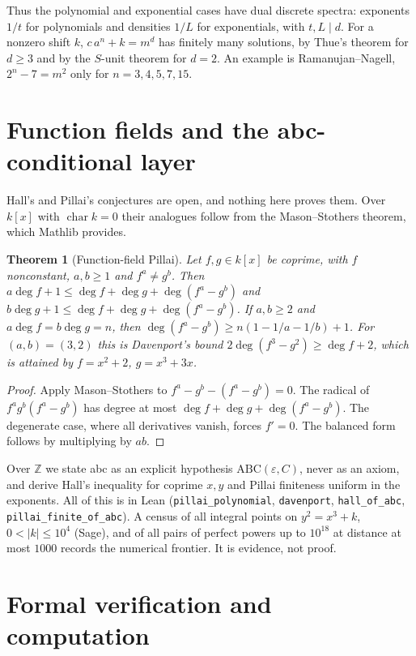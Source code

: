 \documentclass[11pt]{amsart}
\newtheorem{theorem}{Theorem}[section]
\theoremstyle{definition}
\theoremstyle{remark}
\newcommand{\Z}{\mathbb{Z}}
\newcommand{\lean}[1]{\texttt{#1}}
\begin{document}
Thus the polynomial and exponential cases have dual discrete spectra: exponents $1/t$ for polynomials and densities $1/L$ for exponentials, with $t,L\mid d$. For a nonzero shift $k$, $c\,a^n+k=m^d$ has finitely many solutions, by Thue's theorem for $d\ge3$ and by the $S$-unit theorem for $d=2$. An example is Ramanujan--Nagell, $2^n-7=m^2$ only for $n=3,4,5,7,15$.

\section{Function fields and the abc-conditional layer}\label{sec:ff}

Hall's and Pillai's conjectures are open, and nothing here proves them. Over $k[x]$ with $\operatorname{char}k=0$ their analogues follow from the Mason--Stothers theorem, which Mathlib provides.

\begin{theorem}[Function-field Pillai]\label{thm:ffpillai}
Let $f,g\in k[x]$ be coprime, with $f$ nonconstant, $a,b\ge1$ and $f^a\ne g^b$. Then $a\deg f+1\le\deg f+\deg g+\deg(f^a-g^b)$ and $b\deg g+1\le\deg f+\deg g+\deg(f^a-g^b)$. If $a,b\ge2$ and $a\deg f=b\deg g=n$, then $\deg(f^a-g^b)\ge n(1-1/a-1/b)+1$. For $(a,b)=(3,2)$ this is Davenport's bound $2\deg(f^3-g^2)\ge\deg f+2$, which is attained by $f=x^2+2$, $g=x^3+3x$.
\end{theorem}

\begin{proof}
Apply Mason--Stothers to $f^a-g^b-(f^a-g^b)=0$. The radical of $f^ag^b(f^a-g^b)$ has degree at most $\deg f+\deg g+\deg(f^a-g^b)$. The degenerate case, where all derivatives vanish, forces $f'=0$. The balanced form follows by multiplying by $ab$.
\end{proof}

Over $\Z$ we state abc as an explicit hypothesis $\mathrm{ABC}(\varepsilon,C)$, never as an axiom, and derive Hall's inequality for coprime $x,y$ and Pillai finiteness uniform in the exponents. All of this is in Lean (\lean{pillai\_polynomial}, \lean{davenport}, \lean{hall\_of\_abc}, \lean{pillai\_finite\_of\_abc}). A census of all integral points on $y^2=x^3+k$, $0<|k|\le10^4$ (Sage), and of all pairs of perfect powers up to $10^{18}$ at distance at most $1000$ records the numerical frontier. It is evidence, not proof.

\section{Formal verification and computation}\label{sec:formal}
\sloppy
\end{document}
